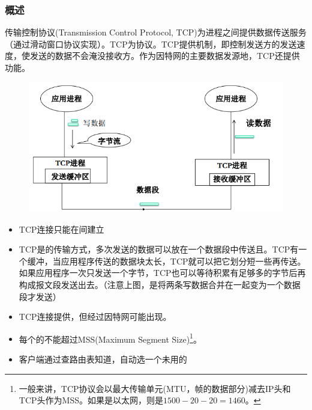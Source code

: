 \subsubsection{概述}
传输控制协议(Transmission Control Protocol, TCP)为进程之间提供数据传送服务（通过滑动窗口协议实现）。TCP为协议。TCP提供机制，即控制发送方的发送速度，使发送的数据不会淹没接收方。作为因特网的主要数据发源地，TCP还提供功能。
\begin{figure}[H]
    \centering
    \includegraphics[width=0.5\linewidth]{fig/TCP.PNG}
\end{figure}

\begin{itemize}
\item TCP连接只能在间建立
\item TCP是的传输方式，多次发送的数据可以放在一个数据段中传送且。TCP有一个缓冲，当应用程序传送的数据块太长，TCP就可以把它划分短一些再传送。如果应用程序一次只发送一个字节，TCP也可以等待积累有足够多的字节后再构成报文段发送出去。（注意上图，是将两条写数据合并在一起变为一个数据段才发送）
\item TCP连接提供，但经过因特网可能出现。
\item 每个的不能超过MSS(Maximum Segment Size)\footnote{一般来讲，TCP协议会以最大传输单元(MTU，帧的数据部分)减去IP头和TCP头作为MSS。如果是以太网，则是$1500-20-20=1460$。}。
\item 客户端通过查路由表知道，自动选一个未用的
\end{itemize}


